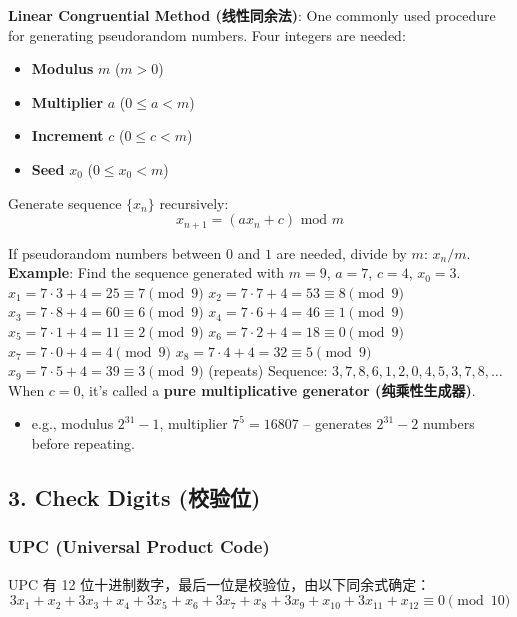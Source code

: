 \documentclass[10pt,a4paper,openany]{ctexbook}
\theoremstyle{definition}
\theoremstyle{remark}
\begin{document}
\textbf{Linear Congruential Method (线性同余法)}: One commonly used procedure for generating pseudorandom numbers.
Four integers are needed:
\begin{itemize}
\item \textbf{Modulus} $m$ ($m > 0$)
\item \textbf{Multiplier} $a$ ($0 \leq a < m$)
\item \textbf{Increment} $c$ ($0 \leq c < m$)
\item \textbf{Seed} $x_0$ ($0 \leq x_0 < m$)

\end{itemize}

Generate sequence $\{x_n\}$ recursively:
\[
x_{n+1} = (a x_n + c) \text{ mod } m
\]

If pseudorandom numbers between $0$ and $1$ are needed, divide by $m$: $x_n / m$.
\textbf{Example}: Find the sequence generated with $m = 9$, $a = 7$, $c = 4$, $x_0 = 3$.
$x_1 = 7 \cdot 3 + 4 = 25 \equiv 7 \pmod{9}$
$x_2 = 7 \cdot 7 + 4 = 53 \equiv 8 \pmod{9}$
$x_3 = 7 \cdot 8 + 4 = 60 \equiv 6 \pmod{9}$
$x_4 = 7 \cdot 6 + 4 = 46 \equiv 1 \pmod{9}$
$x_5 = 7 \cdot 1 + 4 = 11 \equiv 2 \pmod{9}$
$x_6 = 7 \cdot 2 + 4 = 18 \equiv 0 \pmod{9}$
$x_7 = 7 \cdot 0 + 4 = 4 \pmod{9}$
$x_8 = 7 \cdot 4 + 4 = 32 \equiv 5 \pmod{9}$
$x_9 = 7 \cdot 5 + 4 = 39 \equiv 3 \pmod{9}$ (repeats)
Sequence: $3, 7, 8, 6, 1, 2, 0, 4, 5, 3, 7, 8, \dots$
When $c = 0$, it's called a \textbf{pure multiplicative generator (纯乘性生成器)}.
\begin{itemize}
\item e.g., modulus $2^{31} - 1$, multiplier $7^5 = 16807$ -- generates $2^{31} - 2$ numbers before repeating.

\end{itemize}

\vspace{-2pt}

\subsection{3. Check Digits (校验位)}

\subsubsection{UPC (Universal Product Code)}

UPC 有 12 位十进制数字，最后一位是校验位，由以下同余式确定：
\[
3x_1 + x_2 + 3x_3 + x_4 + 3x_5 + x_6 + 3x_7 + x_8 + 3x_9 + x_{10} + 3x_{11} + x_{12} \equiv 0 \pmod{10}
\]
\end{document}
